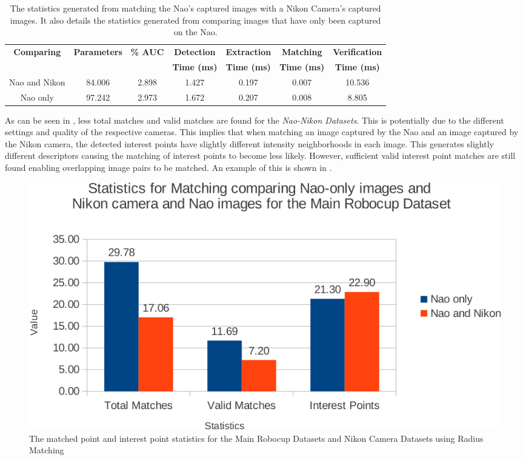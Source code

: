 \documentclass[11pt]{report}
\begin{document}
\begin{table}
\centering
\caption{The statistics generated from matching the Nao's captured images with
a Nikon Camera's captured images. It also details the statistics generated from comparing images that have only been captured on the Nao.}
\footnotesize
\begin{tabular}{|c|c|c|c|c|c|c|}
\hline 
\textbf{Comparing} & \textbf{Parameters} & \textbf{\% AUC} & \textbf{Detection} & \textbf{Extraction} & \textbf{Matching} & \textbf{Verification}\tabularnewline
 &  &  & \textbf{Time (ms)} & \textbf{Time (ms)} & \textbf{Time (ms)} & \textbf{Time (ms)}\tabularnewline
\hline 
\hline 
Nao and Nikon & 84.006 & 2.898 & 1.427 & 0.197 & 0.007 & 10.536\tabularnewline
\hline 
Nao only & 97.242 & 2.973 & 1.672 & 0.207 & 0.008 & 8.805\tabularnewline
\hline 
\end{tabular}
\label{tab:naoNikonRobocup}
\end{table}

As can be seen in , less total matches and valid matches are found for the \textit{Nao-Nikon Datasets}. This is potentially due to the different settings and quality of the respective cameras. This implies that when matching an image captured by the Nao and an image captured by the Nikon camera, the detected interest points have slightly different intensity neighborhoods in each image. This generates slightly different descriptors causing the matching of interest points to become less likely. However, sufficient valid interest point matches are still found enabling overlapping image pairs to be matched. An example of this is shown in .\\

\begin{figure}[h!] 
  \centering
    \includegraphics[width=1.0\textwidth]{../Drawings/Graphs/nikon_mrb_matches_keypoints_best.pdf}
    \caption{The matched point and interest point statistics for the Main Robocup Datasets
and Nikon Camera Datasets using Radius Matching}
    \label{fig:nikon_mrb_matches_keypoints}
\end{figure}
\end{document}
